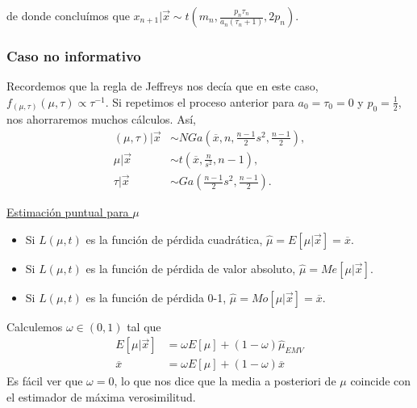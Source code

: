 de donde concluímos que $x_{n+1} | \vec{x} \sim t\left(m_n, \frac{p_n\tau_n}{a_n(\tau_n+1)}, 2p_n \right)$.

\subsubsection{Caso no informativo}
Recordemos que la regla de Jeffreys nos decía que en este caso, $f_{(\mu,\tau)}(\mu,\tau) \propto \tau^{-1}$. Si repetimos el proceso anterior para $a_0 = \tau_0 = 0$ y $p_0 = \frac{1}{2}$, nos ahorraremos muchos cálculos. Así,
\begin{align*}
    (\mu,\tau) | \vec{x} & \sim NGa\left( \overline{x}, n, \frac{n-1}{2}s^2, \frac{n-1}{2}\right), \\
    \mu | \vec{x}        & \sim t \left( \overline{x}, \frac{n}{s^2},n-1 \right),                  \\
    \tau | \vec{x}       & \sim Ga\left( \frac{n-1}{2}s^2, \frac{n-1}{2} \right).
\end{align*}

\underline{Estimación puntual para $\mu$}
\begin{itemize}
    \item Si $L(\mu,t)$ es la función de pérdida cuadrática, $\widehat{\mu} = E[\mu |  \vec{x}] = \overline{x}$.
    \item Si $L(\mu,t)$ es la función de pérdida de valor absoluto, $\widehat{\mu} = Me[\mu |  \vec{x}]$.
    \item Si $L(\mu,t)$ es la función de pérdida 0-1, $ \widehat{\mu} = Mo[\mu |  \vec{x}] = \overline{x}$.
\end{itemize}
Calculemos $\omega \in (0,1)$ tal que
\begin{align*}
    E[\mu  | \vec{x}] & = \omega E[\mu]  + (1 - \omega) \widehat{\mu }_{EMV} \\
    \overline{x}      & = \omega E[\mu] + (1 - \omega) \overline{x}
\end{align*}
Es fácil ver que $\omega = 0$, lo que nos dice que la media a posteriori de $\mu$ coincide con el estimador de máxima verosimilitud.

